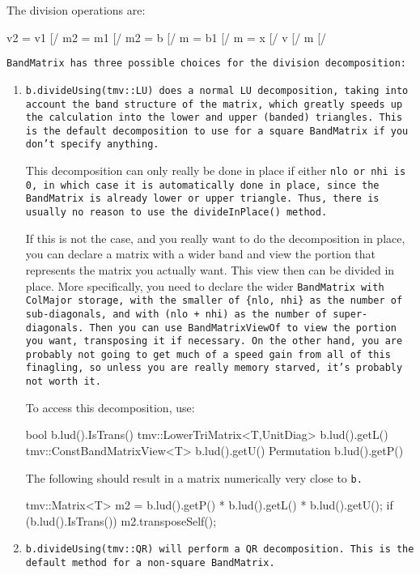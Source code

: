 The division operations are:
\begin{tmvcode}
v2 = v1 [/%
m2 = m1 [/%
m2 = b [/%
m = b1 [/%
m = x [/%
v [/%
m [/%
\end{tmvcode}
\tt{BandMatrix} has three possible choices for the division decomposition:
\begin{enumerate}
\item
\tt{b.divideUsing(tmv::LU)} does a normal LU decomposition,
taking into account the band structure of the matrix, which greatly speeds up 
the calculation into the lower and upper (banded) triangles.
This is the default decomposition to use for a square \tt{BandMatrix} 
if you don't specify anything.

This decomposition can only really
be done in place if either \tt{nlo} or \tt{nhi} is 0,
in which case it is automatically done in place,
since the \tt{BandMatrix} is already lower or upper triangle.
Thus, there is usually no reason to use the \tt{divideInPlace()} method.

If this is not the case, and you really want to do the decomposition in place, you can
declare a matrix with a wider band and view the portion that represents the matrix
you actually want.  This view then can be divided in place.  More specifically,
you need to declare the wider \tt{BandMatrix} with \tt{ColMajor} storage,
with the smaller of
\{\tt{nlo}, \tt{nhi}\} as the number of sub-diagonals, and with 
(\tt{nlo} + \tt{nhi}) as the number of super-diagonals.  
Then you can use \tt{BandMatrixViewOf} to view the portion you want, transposing it if
necessary.  On the other hand, you are probably not going to get much of a speed gain 
from all of this finagling, so unless you are really memory starved, it's probably not worth it.

To access this decomposition, use:
\begin{tmvcode}
bool b.lud().IsTrans()
tmv::LowerTriMatrix<T,UnitDiag> b.lud().getL()
tmv::ConstBandMatrixView<T> b.lud().getU()
Permutation b.lud().getP()
\end{tmvcode}
The following should result in a matrix numerically very close to \tt{b}.
\begin{tmvcode}
tmv::Matrix<T> m2 = b.lud().getP() * b.lud().getL() * b.lud().getU();
if (b.lud().IsTrans()) m2.transposeSelf();
\end{tmvcode}

\item
\tt{b.divideUsing(tmv::QR)} will perform a QR decomposition.  
This is the default method for a non-square \tt{BandMatrix}.


\end{enumerate}
